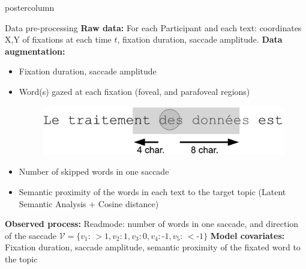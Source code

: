 \documentclass[final,hyperref={pdfpagelabels=false}]{beamer}
\begin{document}
\begin{frame}
\begin{columns}
\begin{column}{.50\textwidth}
\begin{beamercolorbox}[center,wd=\textwidth]{postercolumn}
\begin{minipage}[T]{.98\textwidth}
{            \vfill
            \begin{block}{Data pre-processing}
                \textbf{Raw data:} For each Participant and each text: coordinates X,Y of fixations at each time $t$,
                fixation duration, saccade amplitude.
                \vskip0.5cm
                \textbf{Data augmentation:}
                \begin{itemize}
                    \item[\bullet] Fixation duration, saccade amplitude
                    \item[\bullet]
                    \begin{minipage}{0.50\textwidth}
                        Word(s) gazed at each fixation (foveal, and parafoveal regions)
                    \end{minipage}
                    \begin{minipage}{0.40\textwidth}
                        \begin{figure}[H]
                            \includegraphics[width=0.8\linewidth]{fixation_window.jpg}
                        \end{figure}
                    \end{minipage}
                    \item[\bullet] Number of skipped words in one saccade
                    \item[\bullet] Semantic proximity of the words in each text to the target topic (Latent Semantic Analysis + Cosine distance)
                \end{itemize}
                \vskip0.5cm
                \textbf{Observed process:} Readmode:  number of words in one saccade, and direction of the saccade
                $\mathcal{V} =\{ v_1:\,> \text{1}, v_2: \text{1}, v_3: \text{0}, v_4: \text{-1}, v_5:\,< \text{-1}\} $
                \vskip0.5cm
                \textbf{Model covariates:} Fixation duration, saccade amplitude, semantic proximity of the fixated word to the topic


\end{block}}
\end{minipage}
\end{beamercolorbox}
\end{column}
\end{columns}
\end{frame}
\end{document}
